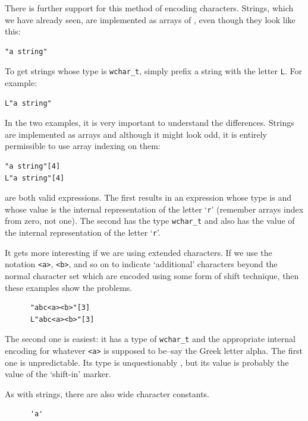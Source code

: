     There is further support for this method of encoding characters.
     Strings, which we have already seen, are implemented as arrays of
     \kchar, even though they look like this:


    \begin{Verbatim}
"a string"
\end{Verbatim}

    To get strings whose type is \texttt{wchar\_t}, simply prefix a
     string with the letter \texttt{L}. For example:


    \begin{Verbatim}
L"a string"
\end{Verbatim}

    In the two examples, it is very important to understand the
     differences. Strings are implemented as arrays and although it might look
     odd, it is entirely permissible to use array indexing on them:


    \begin{Verbatim}
"a string"[4]
L"a string"[4]
\end{Verbatim}

    are both valid expressions. The first results in an expression whose
     type is \kchar{} and whose value is the internal representation
     of the letter `\texttt{r}' (remember arrays index from
     zero, not one). The second has the type \texttt{wchar\_t} and also has
     the value of the internal representation of the
     letter `\texttt{r}'.


    It gets more interesting if we are using extended characters. If we use
     the notation \texttt{<a>}, \texttt{<b>}, and so
     on to indicate `additional' characters beyond the normal character
     set which are encoded using some form of shift technique, then these
     examples show the problems.


    \begin{Verbatim}
      "abc<a><b>"[3]
      L"abc<a><b>"[3]
    \end{Verbatim}

    The second one is easiest: it has a type of \texttt{wchar\_t} and
     the appropriate internal encoding for
     whatever \texttt{<a>} is supposed to be--say the
     Greek letter alpha. The first one is unpredictable. Its type is
     unquestionably \kchar, but its value is probably the value of
     the `shift-in' marker.


    As with strings, there are also wide character constants.


    \begin{Verbatim}
      'a'
    \end{Verbatim}

